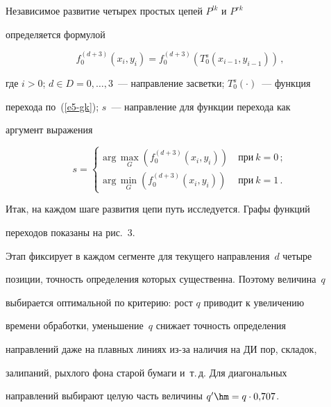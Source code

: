   


  Независимое развитие четырех простых цепей $P^{lk}$ и $P^{rk}$ 


определяется формулой


  \begin{equation}


  f_0^{(d+3)}(x_i,y_i) =f_0^{(d+3)} \left( T_0^s(x_{i-1},y_{i-1})\right)\,,


  \label{e11-gk}


  \end{equation}


где $i>0$; $d\in D=0, \ldots ,3$~---  направление засветки; $T_0^s(\cdot)$~---  функция 


перехода по~(\ref{e5-gk}); $s$~--- направление для функции перехода как 


аргумент выражения


$$


s=\begin{cases}


\mathrm{arg}\,\max\limits_G \left( f_0^{(d+3)}(x_i,y_i)\right) &\ \mbox{при}\ 


k=0\,;\\


\mathrm{arg}\,\min\limits_G \left( f_0^{(d+3)}(x_i,y_i)\right) &\ \mbox{при}\ 


k=1\,.


\end{cases}


$$


  


  Итак, на каждом шаге развития цепи путь исследуется. Графы функций 


переходов показаны на рис.~3.


  


  Этап фиксирует в каждом сегменте для текущего направления~$d$ четыре 


позиции, точность определения которых существенна. Поэтому величина~$q$ 


выбирается оптимальной по критерию: рост $q$ приводит к увеличению 


времени обработки, уменьшение~$q$ снижает точность определения 


направлений даже на плавных линиях из-за наличия на ДИ пор, складок, 


залипаний, рыхлого фона старой бумаги и~т.\,д. Для диагональных 


направлений выбирают целую часть величины  $q^\prime\hm= q\cdot 0{,}707$.


